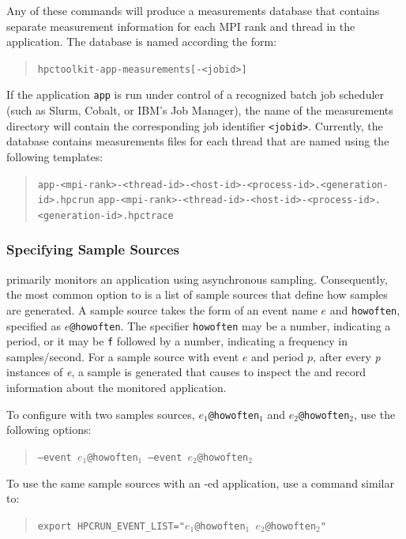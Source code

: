 \documentclass[11pt,letterpaper]{report}
\begin{document}
%
Any of these commands will produce a measurements database that contains separate measurement information for each MPI rank and thread in the application.
The database is named according the form:
\begin{quote}
  \verb|hpctoolkit-app-measurements[-<jobid>]|
\end{quote}
If the application \texttt{app} is run under control of a recognized batch job scheduler (such as Slurm, Cobalt, or IBM's Job Manager), the name of the measurements directory will contain the corresponding job identifier \texttt{<jobid>}.
Currently, the database contains measurements files for each thread that are named using the following templates:
\begin{quote}
  \verb|app-<mpi-rank>-<thread-id>-<host-id>-<process-id>.<generation-id>.hpcrun|
    \verb|app-<mpi-rank>-<thread-id>-<host-id>-<process-id>.<generation-id>.hpctrace|
\end{quote}

\subsubsection{Specifying Sample Sources}

\HPCToolkit{} primarily monitors an application using asynchronous sampling.
Consequently, the most common option to \hpcrun{} is a list of sample sources that define how samples are generated.
A sample source takes the form of an event name $e$ and \texttt{howoften}, specified as \texttt{$e$@howoften}. The specifier \texttt{howoften} may 
be a number, indicating a period, \eg{}  or it may be \texttt{f} followed by a number,  indicating a frequency in samples/second.
For a sample source with event $e$ and period $p$, after every \emph{p} instances of \emph{e}, a sample is generated that causes \hpcrun{} to inspect the and record information about the monitored application.

To configure \hpcrun{} with two samples sources, \texttt{$e_1$@howoften$_1$} and \texttt{$e_2$@howoften$_2$}, use the following options:
\begin{quote}
  \texttt{--event $e_1$@howoften$_1$ --event $e_2$@howoften$_2$}
\end{quote}
To use the same sample sources with an \hpclink{}-ed application, use a command similar to:
\begin{quote}
  \texttt{export HPCRUN\_EVENT\_LIST="$e_1$@howoften$_1$ $e_2$@howoften$_2$"}
\end{quote}
\end{document}
